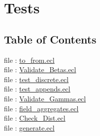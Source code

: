 \chapter*{Tests}
\hypertarget{ML_Core/Tests}{}


\section*{Table of Contents}
file : \hyperlink{ML_Core.Tests.to_from}{to\_from.ecl}   \\
file : \hyperlink{ML_Core.Tests.Validate_Betas}{Validate\_Betas.ecl}   \\
file : \hyperlink{ML_Core.Tests.test_discrete}{test\_discrete.ecl}   \\
file : \hyperlink{ML_Core.Tests.test_appends}{test\_appends.ecl}   \\
file : \hyperlink{ML_Core.Tests.Validate_Gammas}{Validate\_Gammas.ecl}   \\
file : \hyperlink{ML_Core.Tests.field_aggregates}{field\_aggregates.ecl}   \\
file : \hyperlink{ML_Core.Tests.Check_Dist}{Check\_Dist.ecl}   \\
file : \hyperlink{ML_Core.Tests.generate}{generate.ecl}   \\









